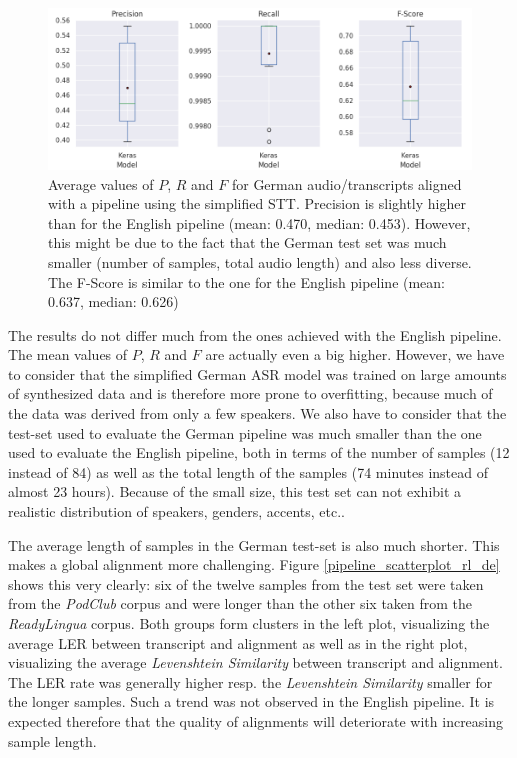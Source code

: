\begin{figure}[h!]
	\includegraphics[width=\linewidth]{./img/boxplot_rl.png}
	\caption{Average values of $P$, $R$ and $F$ for German audio/transcripts aligned with a pipeline using the simplified \ac{STT}. Precision is slightly higher than for the English pipeline (mean: 0.470, median: 0.453). However, this might be due to the fact that the German test set was much smaller (number of samples, total audio length) and also less diverse. The F-Score is similar to the one for the English pipeline (mean: 0.637, median: 0.626)}
	\label{pipeline_boxplot_rl_de}
\end{figure}

The results do not differ much from the ones achieved with the English pipeline. The mean values of $P$, $R$ and $F$ are actually even a big higher. However, we have to consider that the simplified German \ac{ASR} model was trained on large amounts of synthesized data and is therefore more prone to overfitting, because much of the data was derived from only a few speakers. We also have to consider that the test-set used to evaluate the German pipeline was much smaller than the one used to evaluate the English pipeline, both in terms of the number of samples (12 instead of 84) as well as the total length of the samples (74 minutes instead of almost 23 hours). Because of the small size, this test set can not exhibit a realistic distribution of speakers, genders, accents, etc.. 

The average length of samples in the German test-set is also much shorter. This makes a global alignment more challenging. Figure \ref{pipeline_scatterplot_rl_de} shows this very clearly: six of the twelve samples from the test set were taken from the \textit{PodClub} corpus and were longer than the other six taken from the \textit{ReadyLingua} corpus. Both groups form clusters in the left plot, visualizing the average \ac{LER} between transcript and alignment as well as in the right plot, visualizing the average \textit{Levenshtein Similarity} between transcript and alignment. The \ac{LER} rate was generally higher resp. the \textit{Levenshtein Similarity} smaller for the longer samples. Such a trend was not observed in the English pipeline. It is expected therefore that the quality of alignments will deteriorate with increasing sample length.

